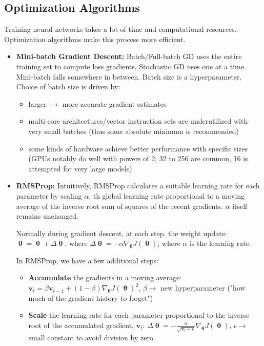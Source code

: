 \subsection*{Optimization Algorithms}
Training neural networks takes a lot of time and computational resources. Optimization algorithms make this process more efficient.
\begin{itemize}
  \item \textbf{Mini-batch Gradient Descent:} Batch/Full-batch GD uses the entire training set to compute loss gradients, Stochastic GD uses one at a time. Mini-batch falls somewhere in between. Batch size is a hyperparameter. Choice of batch size is driven by:
    \begin{itemize}
      \item larger $\rightarrow$ more accurate gradient estimates 
      \item multi-core architectures/vector instruction sets are underutilized with very small batches (thus some absolute minimum is recommended)
      \item some kinds of hardware achieve better performance with specific sizes (GPUs notably do well with powers of 2; 32 to 256 are common, 16 is attempted for very large models)
    \end{itemize}
  \item \textbf{RMSProp:} Intuitively, RMSProp calculates a suitable learning rate for each parameter by scaling $\alpha$, th global learning rate proportional to a moving average of the inverse root sum of squares of the recent gradients. $\alpha$ itself remains unchanged.

    Normally during gradient descent, at each step, the weight update: $\boldsymbol{\uptheta} = \boldsymbol{\uptheta} + \Delta \boldsymbol{\uptheta}$, where $\Delta \boldsymbol{\uptheta} = -\alpha \nabla_{\boldsymbol{\uptheta}} J(\boldsymbol{\uptheta})$, where $\alpha$ is the learning rate.

    In RMSProp, we have a few additional steps:

    \begin{itemize}
      \item \textbf{Accumulate} the gradients in a moving average: $\mathbf{v}_t = \beta \mathbf{v}_{t-1} + (1 - \beta) \nabla_{\boldsymbol{\uptheta}} J(\boldsymbol{\uptheta})^2$, $\beta \rightarrow$ new hyperparameter ("how much of the gradient history to forget")
      \item \textbf{Scale} the learning rate for each parameter proportional to the inverse root of the accumulated gradient, $\mathbf{v}_t$: $\Delta \boldsymbol{\uptheta} = -\frac{\alpha}{\sqrt{\mathbf{v}_t + \epsilon}} \nabla_{\boldsymbol{\uptheta}} J(\boldsymbol{\uptheta})$, $\epsilon \rightarrow$ small constant to avoid division by zero.
    \end{itemize}


\end{itemize}
